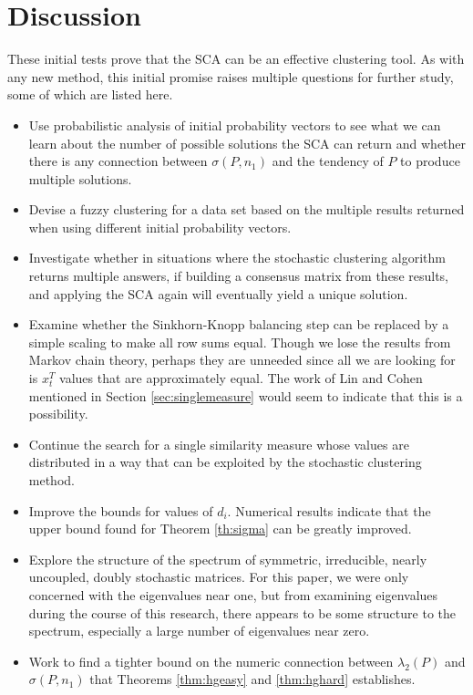 \documentclass[final]{siamltex}
\begin{document}
\section{Discussion}
These initial tests prove that the SCA can be an effective clustering tool. As with any new method, this initial promise raises multiple questions for further study, some of which are listed here.

\begin{itemize}
\item Use probabilistic analysis of initial probability vectors to see what we can learn about the number of possible solutions the SCA can return and whether there is any connection between $\sigma(P,n_{1})$ and the tendency of $P$ to produce multiple solutions.
\item Devise a fuzzy clustering for a data set based on the multiple results returned when using different initial probability vectors.
\item Investigate whether in situations where the stochastic clustering algorithm returns multiple answers, if building a consensus matrix from these results, and applying the SCA again will eventually yield a unique solution.
\item Examine whether the Sinkhorn-Knopp balancing step can be replaced by a simple scaling to make all row sums equal. Though we lose the results from Markov chain theory, perhaps they are unneeded since all we are looking for is $x_{t}^{T}$ values that are approximately equal. The work of Lin and Cohen mentioned in Section \ref{sec:singlemeasure} would seem to indicate that this is a possibility.
\item Continue the search for a single similarity measure whose values are distributed in a way that can be exploited by the stochastic clustering method.
\item Improve the bounds for values of $d_{i}$. Numerical results indicate that the upper bound found for Theorem \ref{th:sigma} can be greatly improved.  
\item Explore the structure of the spectrum of symmetric, irreducible, nearly uncoupled, doubly stochastic matrices. For this paper, we were only concerned with the eigenvalues near one, but from examining eigenvalues during the course of this research, there appears to be some structure to the spectrum, especially a large number of eigenvalues near zero.
\item Work to find a tighter bound on the numeric connection between $\lambda_{2}(P)$ and $\sigma(P,n_{1})$ that Theorems \ref{thm:hgeasy} and \ref{thm:hghard} establishes. 
\end{itemize}
\end{document}
